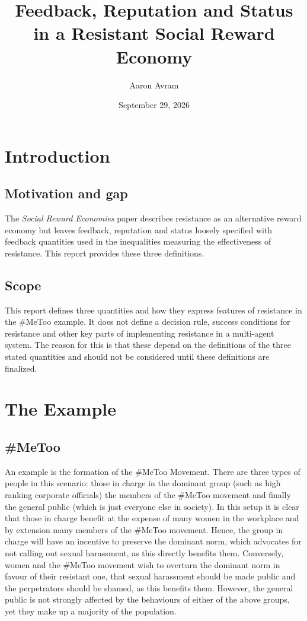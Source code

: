 \documentclass[11pt]{article}
\title{Feedback, Reputation and Status in a Resistant Social Reward Economy}
\author{Aaron Avram}
\date{September 29, 2026}
\theoremstyle{definition}
\theoremstyle{remark}
\begin{document}
\maketitle

\section{Introduction}

\subsection{Motivation and gap}
The \textit{Social Reward Economies} paper describes resistance as an alternative reward economy
but leaves feedback, reputation and status loosely specified with feedback
quantities used in the inequalities measuring the effectiveness of resistance. This report
provides these three definitions.

\subsection{Scope}
This report defines three quantities and how they express features of resistance in the \#MeToo example.
It does not define a decision rule, success conditions for resistance and other key parts
of implementing resistance in a multi-agent system. The reason for this is that these depend on the definitions
of the three stated quantities and should not be considered until these definitions are finalized.

\section{The Example}

\subsection{\#MeToo}
An example is the formation of the \#MeToo Movement. There are three types of people in this scenario:
those in charge in the dominant group (such as high ranking corporate officials)
the members of the \#MeToo movement and finally the general public (which is just everyone else in society). In this setup
it is clear that those in charge benefit at the expense of many women in the workplace
and by extension many members of the \#MeToo movement. Hence, the group in charge
will have an incentive to preserve the dominant norm, which advocates for not calling out sexual harassment,
as this directly benefits them. Conversely, women and the \#MeToo movement wish to overturn the dominant
norm in favour of their resistant one, that sexual harassment should be made public and the perpetrators
should be shamed, as this benefits them. However, the general public is not strongly affected by the behaviours
of either of the above groups, yet they make up a majority of the population.
\end{document}
